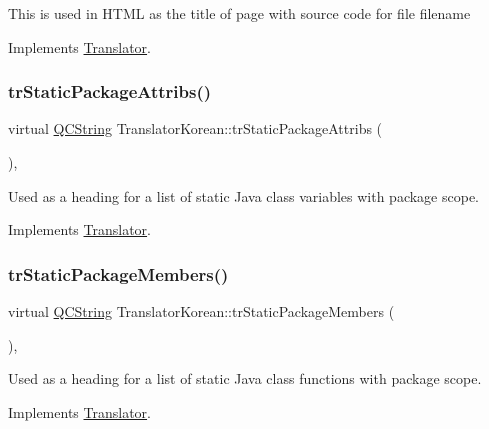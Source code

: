 This is used in H\+T\+ML as the title of page with source code for file filename 

Implements \mbox{\hyperlink{class_translator}{Translator}}.

\mbox{\label{class_translator_korean_ad12e30ffe7ac39eef326618ffbb63854}} 
\subsubsection{\texorpdfstring{trStaticPackageAttribs()}{trStaticPackageAttribs()}}
{\footnotesize\ttfamily virtual \mbox{\hyperlink{class_q_c_string}{Q\+C\+String}} Translator\+Korean\+::tr\+Static\+Package\+Attribs (\begin{DoxyParamCaption}{ }\end{DoxyParamCaption})\hspace{0.3cm}{\ttfamily [inline]}, {\ttfamily [virtual]}}

Used as a heading for a list of static Java class variables with package scope. 

Implements \mbox{\hyperlink{class_translator}{Translator}}.

\mbox{\label{class_translator_korean_aa6ada06686053274f33d7b8b61b58c15}} 
\subsubsection{\texorpdfstring{trStaticPackageMembers()}{trStaticPackageMembers()}}
{\footnotesize\ttfamily virtual \mbox{\hyperlink{class_q_c_string}{Q\+C\+String}} Translator\+Korean\+::tr\+Static\+Package\+Members (\begin{DoxyParamCaption}{ }\end{DoxyParamCaption})\hspace{0.3cm}{\ttfamily [inline]}, {\ttfamily [virtual]}}

Used as a heading for a list of static Java class functions with package scope. 

Implements \mbox{\hyperlink{class_translator}{Translator}}.

